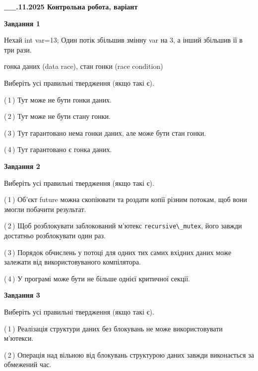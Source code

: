 \documentclass[12pt, ukrainian]{article}
\def\code#1{\Verb!#1!}
\begin{document}
\begin {large}

\textbf{\_\_.11.2025 Контрольна робота, варіант  }\par


{

\begin{center}
\textbf{Завдання 1}
\end{center}
Нехай int var=13; Один потік збільшив змінну var на 3, а інший збільшив її в три рази.

гонка даних (data race), стан гонки (race condition)

Виберіть усі правильні твердження (якщо такі є).\par
\vspace{2mm}
(\,1\,) Тут може не бути гонки даних.%

(\,2\,) Тут може не бути стану гонки.%

(\,3\,) Тут гарантовано нема гонки даних, але може бути стан гонки.%

(\,4\,) Тут гарантовано є гонка даних.%



\begin{center}
\textbf{Завдання 2}
\end{center}
Виберіть усі правильні твердження (якщо такі є).\par
\vspace{2mm}

(\,1\,) Об’єкт future можна скопіювати та роздати копії різним потокам, щоб вони змогли побачити результат.%

(\,2\,) Щоб розблокувати заблокований м’ютекс \code{recursive\_mutex}, його завжди достатньо розблокувати один раз.%

(\,3\,) Порядок обчислень у потоці для одних тих самих вхідних даних може залежати від використовуваного компілятора.%

(\,4\,) У програмі може бути не більше однієї критичної секції.%



\begin{center}
\textbf{Завдання 3}
\end{center}
Виберіть усі правильні твердження (якщо такі є).\par
\vspace{2mm}

(\,1\,) Реалізація структури даних без блокувань не може використовувати м’ютекси.%

(\,2\,) Операція над вільною від блокувань структурою даних завжди виконається за обмежений час.%

}
\end{large}
\end{document}
